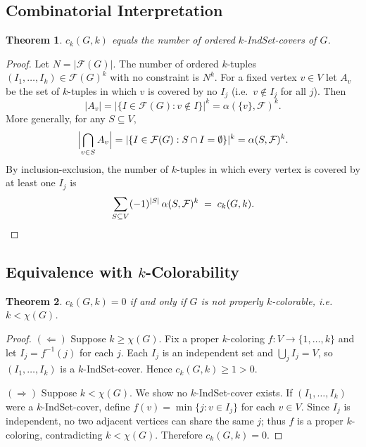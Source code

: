 \documentclass[11pt]{article}
\newtheorem{theorem}{Theorem}
\begin{document}
\subsection{Combinatorial Interpretation}

\begin{theorem}\label{thm:ck-cover}
  $c_k(G,k)$ equals the number of ordered $k$-IndSet-covers of $G$.
\end{theorem}

\begin{proof}
Let $N = |\mathcal{F}(G)|$.  The number of ordered $k$-tuples
$(I_1,\ldots,I_k) \in \mathcal{F}(G)^k$ with no constraint is $N^k$.  For a
fixed vertex $v \in V$ let $A_v$ be the set of $k$-tuples in which $v$ is
covered by no $I_j$ (i.e.\ $v \notin I_j$ for all $j$).  Then
\[
  |A_v| = |\{I \in \mathcal{F}(G) : v \notin I\}|^k = \alpha(\{v\},\mathcal{F})^k.
\]
More generally, for any $S \subseteq V$,
\[
  \Bigl|\bigcap_{v \in S} A_v\Bigr|
  = |\{I \in \mathcal{F}(G) : S \cap I = \emptyset\}|^k
  = \alpha(S, \mathcal{F})^k.
\]
By inclusion-exclusion, the number of $k$-tuples in which every vertex is
covered by at least one $I_j$ is
\[
  \sum_{S \subseteq V} (-1)^{|S|}\,\alpha(S,\mathcal{F})^k
  \;=\; c_k(G,k). \qedhere
\]
\end{proof}

\subsection{Equivalence with $k$-Colorability}

\begin{theorem}\label{thm:chromatic}
  $c_k(G, k) = 0$ if and only if $G$ is not properly $k$-colorable,
  i.e.\ $k < \chi(G)$.
\end{theorem}

\begin{proof}
$(\Leftarrow)$ Suppose $k \geq \chi(G)$.  Fix a proper $k$-coloring
$f: V \to \{1,\ldots,k\}$ and let $I_j = f^{-1}(j)$ for each $j$.  Each $I_j$
is an independent set and $\bigcup_j I_j = V$, so $(I_1,\ldots,I_k)$ is a
$k$-IndSet-cover.  Hence $c_k(G,k) \geq 1 > 0$.

$(\Rightarrow)$ Suppose $k < \chi(G)$.  We show no $k$-IndSet-cover exists.
If $(I_1,\ldots,I_k)$ were a $k$-IndSet-cover, define $f(v) = \min\{j : v \in I_j\}$
for each $v \in V$.  Since $I_j$ is independent, no two adjacent vertices can
share the same $j$; thus $f$ is a proper $k$-coloring, contradicting
$k < \chi(G)$.  Therefore $c_k(G,k) = 0$.
\end{proof}
\end{document}
